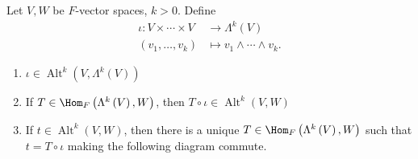 \documentclass[10pt]{mypackage}
\DeclareMathOperator{\Alt}{Alt}
\begin{document}
  \begin{theorem}
    Let $V,W$ be $F$-vector spaces, $k > 0$. Define
    \begin{align*}
      \iota: V\times\cdots\times V &\rightarrow \Lambda^{k}\left(V\right)\\
      \left(v_1,\dots,v_k\right) &\mapsto v_1\wedge\cdots\wedge v_k.
    \end{align*}
    \begin{enumerate}[(1)]
      \item $\iota\in \Alt^{k}\left(V,\Lambda^{k}\left(V\right)\right)$
      \item If $T\in \Hom_{F}\left(\Lambda^{k}\left(V\right),W\right)$, then $T\circ\iota\in \Alt^{k}\left(V,W\right)$
      \item If $t\in \Alt^{k}\left(V,W\right)$, then there is a unique $T\in \Hom_{F}\left(\Lambda^{k}\left(V\right),W\right)$ such that $t = T\circ \iota$ making the following diagram commute.
    \end{enumerate}
    \begin{center}
    \end{center}
  \end{theorem}
\end{document}
